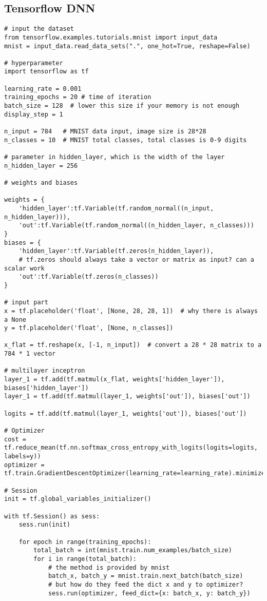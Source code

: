 \documentclass{article}
\begin{document}
\subsection{Tensorflow DNN}
\begin{lstlisting}
# input the dataset
from tensorflow.examples.tutorials.mnist import input_data
mnist = input_data.read_data_sets(".", one_hot=True, reshape=False)

# hyperparameter
import tensorflow as tf

learning_rate = 0.001
training_epochs = 20 # time of iteration
batch_size = 128  # lower this size if your memory is not enough
display_step = 1

n_input = 784   # MNIST data input, image size is 28*28
n_classes = 10  # MNIST total classes, total classes is 0-9 digits

# parameter in hidden_layer, which is the width of the layer
n_hidden_layer = 256

# weights and biases

weights = {
	'hidden_layer':tf.Variable(tf.random_normal((n_input, n_hidden_layer))),
	'out':tf.Variable(tf.random_normal((n_hidden_layer, n_classes)))
}
biases = {
	'hidden_layer':tf.Variable(tf.zeros(n_hidden_layer)),
	# tf.zeros should always take a vector or matrix as input? can a scalar work
	'out':tf.Variable(tf.zeros(n_classes))
}

# input part
x = tf.placeholder('float', [None, 28, 28, 1])  # why there is always a None
y = tf.placeholder('float', [None, n_classes])

x_flat = tf.reshape(x, [-1, n_input])  # convert a 28 * 28 matrix to a 784 * 1 vector

# multilayer inceptron
layer_1 = tf.add(tf.matmul(x_flat, weights['hidden_layer']), biases['hidden_layer'])
layer_1 = tf.add(tf.matmul(layer_1, weights['out']), biases['out'])

logits = tf.add(tf.matmul(layer_1, weights['out']), biases['out'])

# Optimizer
cost = tf.reduce_mean(tf.nn.softmax_cross_entropy_with_logits(logits=logits, labels=y))
optimizer = tf.train.GradientDescentOptimizer(learning_rate=learning_rate).minimize(cost)

# Session
init = tf.global_variables_initializer()

with tf.Session() as sess:
	sess.run(init)

	for epoch in range(training_epochs):
		total_batch = int(mnist.train.num_examples/batch_size)
		for i in range(total_batch):
			# the method is provided by mnist
			batch_x, batch_y = mnist.train.next_batch(batch_size)
			# but how do they feed the dict x and y to optimizer?
			sess.run(optimizer, feed_dict={x: batch_x, y: batch_y})

\end{lstlisting}
\end{document}
